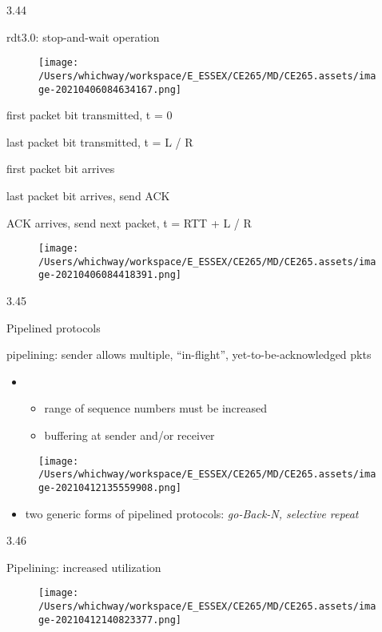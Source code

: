 \documentclass[
]{article}
\begin{document}
3.44

rdt3.0: stop-and-wait operation

\begin{figure}
\centering
\texttt{[image: /Users/whichway/workspace/E\_ESSEX/CE265/MD/CE265.assets/image-20210406084634167.png]}
\caption{}
\end{figure}

first packet bit transmitted, t = 0

last packet bit transmitted, t = L / R

first packet bit arrives

last packet bit arrives, send ACK

ACK arrives, send next packet, t = RTT + L / R

\begin{figure}
\centering
\texttt{[image: /Users/whichway/workspace/E\_ESSEX/CE265/MD/CE265.assets/image-20210406084418391.png]}
\caption{}
\end{figure}

3.45

Pipelined protocols

pipelining: sender allows multiple, ``in-flight'',
yet-to-be-acknowledged pkts

\begin{itemize}
\item
  \begin{itemize}
  \item
    range of sequence numbers must be increased
  \item
    buffering at sender and/or receiver
  \end{itemize}
\end{itemize}

\begin{figure}
\centering
\texttt{[image: /Users/whichway/workspace/E\_ESSEX/CE265/MD/CE265.assets/image-20210412135559908.png]}
\caption{}
\end{figure}

\begin{itemize}
\item
  two generic forms of pipelined protocols: \emph{go-Back-N, selective
  repeat}
\end{itemize}

3.46

Pipelining: increased utilization

\begin{figure}
\centering
\texttt{[image: /Users/whichway/workspace/E\_ESSEX/CE265/MD/CE265.assets/image-20210412140823377.png]}
\caption{}
\end{figure}
\end{document}
